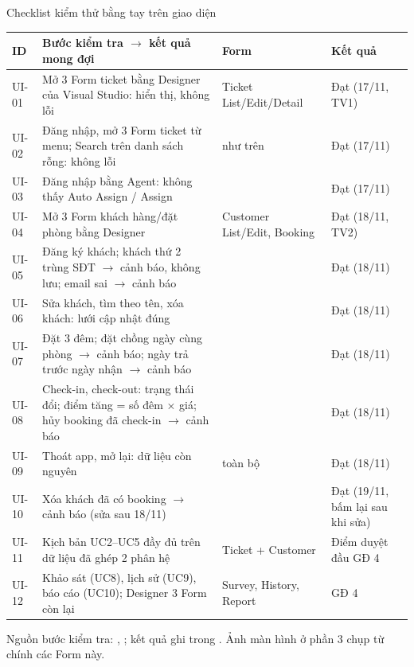 \begin{frame}{Checklist kiểm thử bằng tay trên giao diện}
\tiny
\begin{tabularx}{\textwidth}{@{}L{0.9cm}YL{3.0cm}L{2.4cm}@{}}
\toprule
\textbf{ID} & \textbf{Bước kiểm tra $\to$ kết quả mong đợi} & \textbf{Form} & \textbf{Kết quả} \\
\midrule
UI-01 & Mở 3 Form ticket bằng Designer của Visual Studio: hiển thị, không lỗi & Ticket List/Edit/Detail & \textcolor{okc}{Đạt} (17/11, TV1) \\
UI-02 & Đăng nhập, mở 3 Form ticket từ menu; Search trên danh sách rỗng: không lỗi & như trên & \textcolor{okc}{Đạt} (17/11) \\
UI-03 & Đăng nhập bằng Agent: không thấy Auto Assign / Assign &  & \textcolor{okc}{Đạt} (17/11) \\
UI-04 & Mở 3 Form khách hàng/đặt phòng bằng Designer & Customer List/Edit, Booking & \textcolor{okc}{Đạt} (18/11, TV2) \\
UI-05 & Đăng ký khách; khách thứ 2 trùng SĐT $\to$ cảnh báo, không lưu; email sai $\to$ cảnh báo &  & \textcolor{okc}{Đạt} (18/11) \\
UI-06 & Sửa khách, tìm theo tên, xóa khách: lưới cập nhật đúng &  & \textcolor{okc}{Đạt} (18/11) \\
UI-07 & Đặt 3 đêm; đặt chồng ngày cùng phòng $\to$ cảnh báo; ngày trả trước ngày nhận $\to$ cảnh báo &  & \textcolor{okc}{Đạt} (18/11) \\
UI-08 & Check-in, check-out: trạng thái đổi; điểm tăng = số đêm $\times$ giá; hủy booking đã check-in $\to$ cảnh báo &  & \textcolor{okc}{Đạt} (18/11) \\
UI-09 & Thoát app, mở lại: dữ liệu còn nguyên & toàn bộ & \textcolor{okc}{Đạt} (18/11) \\
UI-10 & Xóa khách đã có booking $\to$ cảnh báo (sửa sau  18/11) &  & \textcolor{okc}{Đạt} (19/11, bấm lại sau khi sửa) \\
UI-11 & Kịch bản UC2--UC5 đầy đủ trên dữ liệu đã ghép 2 phân hệ & Ticket + Customer & \textcolor{midc}{Điểm duyệt đầu GĐ 4} \\
UI-12 & Khảo sát (UC8), lịch sử (UC9), báo cáo (UC10); Designer 3 Form còn lại & Survey, History, Report & \textcolor{warn}{GĐ 4} \\
\bottomrule
\end{tabularx}

\vspace{1mm}
{\tiny Nguồn bước kiểm tra: , ; kết quả ghi trong . Ảnh màn hình ở phần 3 chụp từ chính các Form này.\par}
\end{frame}

